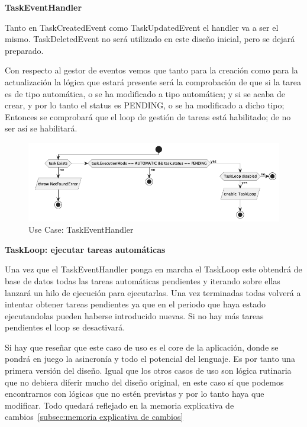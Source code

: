 \textbf{TaskEventHandler}

Tanto en TaskCreatedEvent como TaskUpdatedEvent el handler va a ser el mismo. TaskDeletedEvent no será utilizado en este diseño inicial, pero se dejará preparado.


Con respecto al gestor de eventos vemos que tanto para la creación como para la actualización la lógica que estará presente será la comprobación de que si la tarea es de tipo automática, o se ha modificado a tipo automática; y si se acaba de crear, y por lo tanto el status es PENDING, o se ha modificado a dicho tipo; Entonces se comprobará que el loop de gestión de tareas está habilitado; de no ser así se habilitará.

\begin{figure}[H]
    \centering
    \includegraphics[height=0.2\textheight]{./part/Proyecto_ejecutivo/memoria_descriptiva/descripcionDelProyecto/manager/uml/taskEventHandlerUseCase}
    \caption{Use Case: TaskEventHandler}\label{fig:Use Case-TaskEventHandler}
\end{figure}

\textbf{TaskLoop: ejecutar tareas automáticas}\label{ref:X}

Una vez que el TaskEventHandler ponga en marcha el TaskLoop este obtendrá de base de datos todas las tareas automáticas pendientes y iterando sobre ellas lanzará un hilo de ejecución para ejecutarlas. Una vez terminadas todas volverá a intentar obtener tareas pendientes ya que en el periodo que haya estado ejecutandolas pueden haberse introducido nuevas. Si no hay más tareas pendientes el loop se desactivará.

Si hay que reseñar que este caso de uso es el core de la aplicación, donde se pondrá en juego la asincronía y todo el potencial del lenguaje. Es por tanto una primera versión del diseño. Igual que los otros casos de uso son lógica rutinaria que no debiera diferir mucho del diseño original, en este caso sí que podemos encontrarnos con lógicas que no estén previstas y por lo tanto haya que modificar. Todo quedará reflejado en la memoria explicativa de cambios~\cref{subsec:memoria explicativa de cambios}

